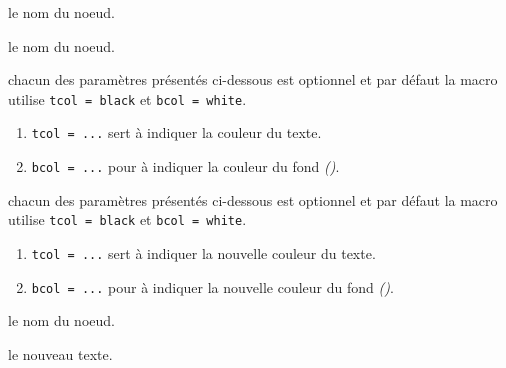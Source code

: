 \documentclass[12pt,a4paper]{article}
\begin{document}


\separation



\IDarg{} le nom du noeud.


%
%
%
%




\separation



 le nom du noeud.

 chacun des paramètres présentés ci-dessous est optionnel et par défaut la macro utilise \verb#tcol = black# et \verb#bcol = white#.

\begin{enumerate}
	\item \verb#tcol = ...# sert à indiquer la couleur du texte.

	\item \verb#bcol = ...# pour à indiquer la couleur du fond \emph{()}.
\end{enumerate}



%
%
%
%




\separation



\IDoption{} chacun des paramètres présentés ci-dessous est optionnel et par défaut la macro utilise \verb#tcol = black# et \verb#bcol = white#.

\begin{enumerate}
	\item \verb#tcol = ...# sert à indiquer la nouvelle couleur du texte.

	\item \verb#bcol = ...# pour à indiquer la nouvelle couleur du fond \emph{()}.
\end{enumerate}

 le nom du noeud.

 le nouveau texte.
\end{document}
